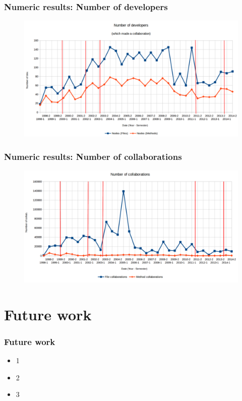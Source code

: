 \documentclass{beamer}
\begin{document}
\begin{frame}
\frametitle{Numeric results: Number of developers}
\begin{figure}
\includegraphics[scale=0.32]{chart1.png}
\label{fig:chartdev1}
\end{figure}
\end{frame}

\begin{frame}
\frametitle{Numeric results: Number of collaborations}
\begin{figure}
\includegraphics[scale=0.32]{chart2.png}
\label{fig:chartdev2}
\end{figure}
\end{frame}

\section{Future work}

\begin{frame}
\frametitle{Future work}
\begin{itemize}
\item 1
\item 2
\item 3
\end{itemize}
\end{frame}
\end{document}
